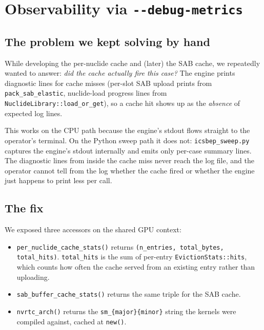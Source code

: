 \section{Observability via \texttt{-{}-debug-metrics}}
\label{sec:observability}

\subsection{The problem we kept solving by hand}

While developing the per-nuclide cache and (later) the SAB cache,
we repeatedly wanted to answer: \emph{did the cache actually fire
this case?} The engine prints diagnostic lines for cache misses
(per-slot SAB upload prints from \texttt{pack\_sab\_elastic},
nuclide-load progress lines from
\texttt{NuclideLibrary::load\_or\_get}), so a cache hit shows up
as the \emph{absence} of expected log lines.

This works on the CPU path because the engine's stdout flows
straight to the operator's terminal. On the Python sweep path
it does not: \texttt{icsbep\_sweep.py} captures the engine's
stdout internally and emits only per-case summary lines. The
diagnostic lines from inside the cache miss never reach the log
file, and the operator cannot tell from the log whether the cache
fired or whether the engine just happens to print less per call.

\subsection{The fix}

We exposed three accessors on the shared GPU context:

\begin{itemize}
    \item \texttt{per\_nuclide\_cache\_stats()} returns
        \texttt{(n\_entries, total\_bytes, total\_hits)}.
        \texttt{total\_hits} is the sum of per-entry
        \texttt{EvictionStats::hits}, which counts how often the
        cache served from an existing entry rather than uploading.
    \item \texttt{sab\_buffer\_cache\_stats()} returns the same
        triple for the SAB cache.
    \item \texttt{nvrtc\_arch()} returns the
        \texttt{sm\_\{major\}\{minor\}} string the kernels were
        compiled against, cached at \texttt{new()}.
\end{itemize}

